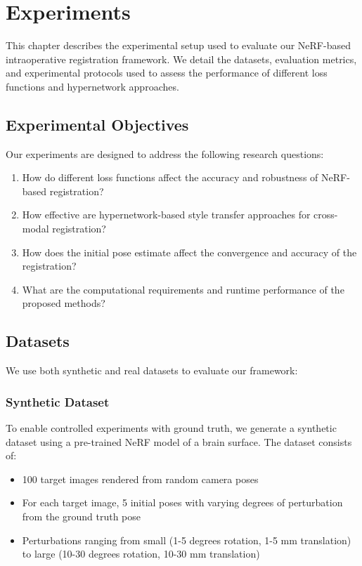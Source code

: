 \chapter{Experiments}

This chapter describes the experimental setup used to evaluate our NeRF-based intraoperative registration framework. We detail the datasets, evaluation metrics, and experimental protocols used to assess the performance of different loss functions and hypernetwork approaches.

\section{Experimental Objectives}
Our experiments are designed to address the following research questions:

\begin{enumerate}
    \item How do different loss functions affect the accuracy and robustness of NeRF-based registration?
    \item How effective are hypernetwork-based style transfer approaches for cross-modal registration?
    \item How does the initial pose estimate affect the convergence and accuracy of the registration?
    \item What are the computational requirements and runtime performance of the proposed methods?
\end{enumerate}

\section{Datasets}
We use both synthetic and real datasets to evaluate our framework:

\subsection{Synthetic Dataset}
To enable controlled experiments with ground truth, we generate a synthetic dataset using a pre-trained NeRF model of a brain surface. The dataset consists of:

\begin{itemize}
    \item 100 target images rendered from random camera poses
    \item For each target image, 5 initial poses with varying degrees of perturbation from the ground truth pose
    \item Perturbations ranging from small (1-5 degrees rotation, 1-5 mm translation) to large (10-30 degrees rotation, 10-30 mm translation)
\end{itemize}


